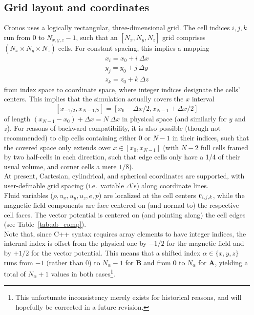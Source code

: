 \subsection{Grid layout and coordinates}
\label{grid+coords}

{\sc Cronos} uses a logically rectangular, three-dimensional grid. The
cell indices $i,j,k$ run from 0 to $N_{x,y,z}-1$, such that an
$[N_x,N_y,N_z]$ grid comprises $(N_x \times N_y \times N_z)$ cells.
For constant spacing, this implies a mapping
\begin{eqnarray}
\label{xi_lin}
x_i = x_0 + i \ \Delta x \\
y_j = y_0 + j \ \Delta y \\
\label{zi_lin}
z_k = z_0 + k \ \Delta z
\end{eqnarray}
from index space to coordinate space, where integer indices designate
the cells' centers. This implies that the simulation actually covers
the $x$ interval
\[ [x_{-1/2}, x_{N-1/2}] = [x_0-\Delta x/2,x_{N-1}+\Delta x/2] \] of length
$(x_{N-1}-x_0)+\Delta x = N \ \Delta x$ in physical space (and similarly
for $y$ and $z$). For reasons of backward compatibility, it is also
possible (though not recommended) to clip cells containing either $0$ or
$N-1$ in their indices, such that the covered space only extends over
\mbox{$x \in [x_0, x_{N-1}]$} (with $N-2$ full cells framed by two half-cells
in each direction, such that edge cells only have a 1/4 of their usual
volume, and corner cells a mere $1/8$).\\
At present, Cartesian, cylindrical, and spherical coordinates
are supported, with user-definable grid spacing (i.e.\ variable $\Delta$'s)
along coordinate lines.\\
Fluid variables ($\rho, u_x, u_y, u_z, e, p$) are localized at the
cell centers ${\bf r}_{i,j,k}$, while the magnetic field
components are face-centered on (and normal to) the respective cell
faces. The vector potential is centered on (and pointing along)
the cell edges (see Table~\ref{tab:ab_comp}).\\
Note that, since C++ syntax requires array elements to have integer indices,
the internal index is offset from the physical one by $-1/2$ for the magnetic
field and by $+1/2$ for the vector potential. This means that a shifted index
$\alpha \in \{x,y,z\}$ runs from $-1$ (rather than 0) to $N_{\alpha}-1$ for
{\bf B} and from 0 to $N_{\alpha}$ for {\bf A}, yielding a total of
$N_{\alpha}+1$ values in both cases\footnote{This unfortunate inconsistency
  merely exists for historical reasons, and will hopefully be corrected in a
future revision.}.

